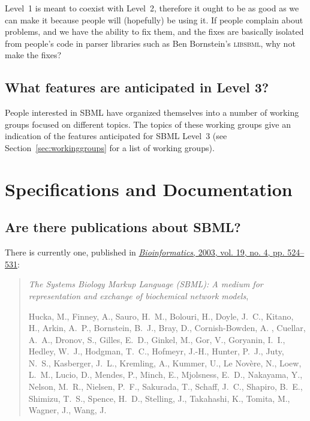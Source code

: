 \documentclass{sbmlfaq}
\begin{document}
Level~1 is meant to coexist with Level~2, therefore it ought to be as good
as we can make it because people will (hopefully) be using it.  If people
complain about problems, and we have the ability to fix them, and the fixes
are basically isolated from people's code in parser libraries such as Ben
Bornstein's \textsc{libsbml}, why not make the fixes?



\subsection{What features are anticipated in Level 3?}

People interested in SBML have organized themselves into a number of
working groups focused on different topics.  The topics of these working
groups give an indication of the features anticipated for SBML Level~3
(see Section~\ref{sec:workinggroups} for a list of working groups).


\section{Specifications and Documentation}
\label{sec:docs}

\subsection{Are there publications about SBML?}

There is currently one, published in
\href{http://bioinformatics.oupjournals.org/cgi/reprint/19/4/524?ijkey=BzZTZ.dDZEXp0U&keytype=ref&siteid=bioinfo}{\emph{Bioinformatics}, 2003,
  vol. 19, no. 4, pp. 524--531}:
\begin{quote}
\emph{The Systems Biology Markup Language (SBML): A medium for
  representation and exchange of biochemical network models}, 

Hucka, M., Finney, A., Sauro, H.~M., Bolouri, H., Doyle, J.~C., Kitano,
H., Arkin, A.~P., Bornstein, B.~J., Bray, D., Cornish-Bowden, A. , Cuellar,
A.~A., Dronov, S., Gilles, E.~D., Ginkel, M., Gor, V., Goryanin, I.~I.,
Hedley, W.~J., Hodgman, T.~C., Hofmeyr, J.-H., Hunter, P.~J., Juty, N.~S.,
Kasberger, J.~L., Kremling, A., Kummer, U., Le Nov\`{e}re, N., Loew,
L.~M., Lucio, D., Mendes, P., Minch, E., Mjolsness, E.~D., Nakayama, Y.,
Nelson, M.~R., Nielsen, P.~F., Sakurada, T., Schaff, J.~C., Shapiro,
B.~E., Shimizu, T.~S., Spence, H.~D., Stelling, J., Takahashi, K.,
Tomita, M., Wagner, J., Wang, J.
\end{quote}
\end{document}
